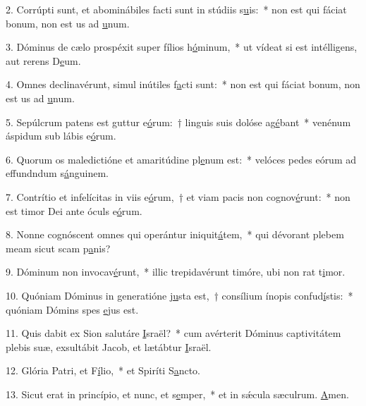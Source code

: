 2. Corrúpti sunt, et abominábiles facti sunt in stúdiis s\uline{u}is:~* non est qui fáciat bonum, non est us ad \uline{u}num.\par 
3. Dóminus de cælo prospéxit super fílios h\uline{ó}minum,~* ut vídeat si est intélligens, aut rerens D\uline{e}um.\par 
4. Omnes declinavérunt, simul inútiles f\uline{a}cti sunt:~* non est qui fáciat bonum, non est us ad \uline{u}num.\par 
5. Sepúlcrum patens est guttur e\uline{ó}rum:~† linguis suis dolóse ag\uline{é}bant~* venénum áspidum sub lábis e\uline{ó}rum.\par 
6. Quorum os maledictióne et amaritúdine pl\uline{e}num est:~* velóces pedes eórum ad effundndum s\uline{á}nguinem.\par 
7. Contrítio et infelícitas in viis e\uline{ó}rum,~† et viam pacis non cognov\uline{é}runt:~* non est timor Dei ante óculs e\uline{ó}rum.\par 
8. Nonne cognóscent omnes qui operántur iniquit\uline{á}tem,~* qui dévorant plebem meam sicut scam p\uline{a}nis?\par 
9. Dóminum non invocav\uline{é}runt,~* illic trepidavérunt timóre, ubi non rat t\uline{i}mor.\par 
10. Quóniam Dóminus in generatióne \uline{ju}sta est,~† consílium ínopis confud\uline{í}stis:~* quóniam Dómins spes \uline{e}jus est.\par 
11. Quis dabit ex Sion salutáre \uline{I}sraël?~* cum avérterit Dóminus captivitátem plebis suæ, exsultábit Jacob, et lætábtur \uline{I}sraël.\par 
12. Glória Patri, et F\uline{í}lio,~* et Spiríti S\uline{a}ncto.\par 
13. Sicut erat in princípio, et nunc, et s\uline{e}mper,~* et in sǽcula sæculrum. \uline{A}men.\par 
